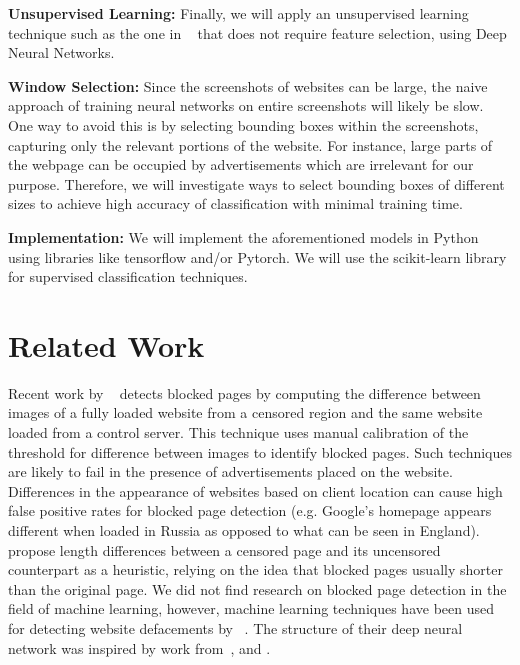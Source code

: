 \documentclass{article} %
\begin{document}
\textbf{Unsupervised Learning:}
 Finally, we will apply an unsupervised learning technique
such as the one in ~\cite{meerkat} that does not require feature selection, using Deep Neural Networks.

\textbf{Window Selection:}
Since the screenshots of websites can be large, the naive approach of training neural networks on entire screenshots will likely be slow.
One way to avoid this is by selecting bounding boxes within the screenshots, capturing only the relevant portions of the website. For instance,
large parts of the webpage can be occupied by advertisements which are irrelevant for our purpose. Therefore, we will investigate ways to select
bounding boxes of different sizes to achieve high accuracy of classification with minimal training time.

\textbf{Implementation:}
We will implement the aforementioned models in Python using libraries like tensorflow and/or Pytorch. We will use the scikit-learn library for supervised classification techniques.
\vspace{-.2cm}
\section{Related Work}
\vspace{-.2cm}
\label{relatedwork}
Recent work by ~\parencite{torabuse} detects blocked pages by computing the difference between images of a fully loaded website from a censored region and the same website loaded
from a control server. This technique uses manual calibration of the threshold for difference between images to identify blocked pages.
Such techniques are likely to fail in the presence of advertisements placed on the website. Differences in the appearance of websites
based on client location can cause high false positive rates for blocked page detection (e.g. Google's homepage appears
different when loaded in Russia as opposed to what can be seen in England). 
~\parencite{imc14_phillipa} propose length differences between a censored page and its uncensored counterpart as a heuristic, 
relying on the idea that blocked pages usually shorter than the original page.
We did not find research on blocked page detection in the field of machine learning, however, machine learning techniques have been used
for detecting website defacements by ~\parencite{meerkat}. The structure of their deep neural network was inspired by work from~\parencite{imagehinton},
 \parencite{nipsandrewng} and \parencite{icmlandrewng}.
\vspace{-.2cm}
\end{document}
